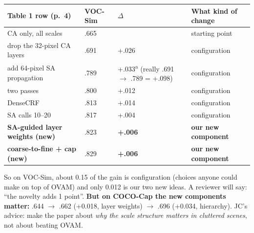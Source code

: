 \documentclass[
  10pt,
]{article}
\newcounter{none} %
\begin{document}
{\def\LTcaptype{none} %
\begin{longtable}[]{@{}
  >{\raggedright\arraybackslash}p{}
  >{\raggedright\arraybackslash}p{}
  >{\raggedright\arraybackslash}p{}
  >{\raggedright\arraybackslash}p{}@{}}
\toprule\noalign{}
\begin{minipage}[b]{\linewidth}\raggedright
Table 1 row (p.~4)
\end{minipage} & \begin{minipage}[b]{\linewidth}\raggedright
VOC-Sim
\end{minipage} & \begin{minipage}[b]{\linewidth}\raggedright
\ensuremath{\Delta}
\end{minipage} & \begin{minipage}[b]{\linewidth}\raggedright
What kind of change
\end{minipage} \\
\midrule\noalign{}
\endhead
\bottomrule\noalign{}
\endlastfoot
CA only, all scales & .665 & & starting point \\
drop the 32-pixel CA layers & .691 & +.026 & configuration \\
add 64-pixel SA propagation & .789 & +.033\textsuperscript{a} (really .691 \ensuremath{\rightarrow} .789 = +.098)
& configuration \\
two passes & .800 & +.012 & configuration \\
DenseCRF & .813 & +.014 & configuration \\
SA calls 10--20 & .817 & +.004 & configuration \\
\textbf{SA-guided layer weights (new)} & .823 & \textbf{+.006} &
\textbf{our new component} \\
\textbf{coarse-to-fine + cap (new)} & .829 & \textbf{+.006} &
\textbf{our new component} \\
\end{longtable}
}

So on VOC-Sim, about 0.15 of the gain is configuration (choices anyone
could make on top of OVAM) and only 0.012 is our two new ideas. A
reviewer will say: ``the novelty adds 1 point''. \textbf{But on COCO-Cap
the new components matter:} .644 \ensuremath{\rightarrow} .662 (+0.018, layer weights) \ensuremath{\rightarrow} .696
(+0.034, hierarchy). JC's advice: make the paper about \emph{why the
scale structure matters in cluttered scenes}, not about beating OVAM.
\end{document}
